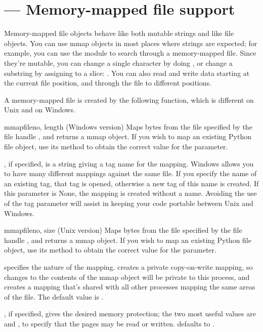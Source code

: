 \section{ ---
	Memory-mapped file support}


Memory-mapped file objects behave like both mutable strings and like
file objects.  You can use mmap objects in most places where strings
are expected; for example, you can use the  module to
search through a memory-mapped file.  Since they're mutable, you can
change a single character by doing , or
change a substring by assigning to a slice:
.  You can also read and write
data starting at the current file position, and 
through the file to different positions.

A memory-mapped file is created by the following function, which is
different on Unix and on Windows.

\begin{funcdesc}{mmap}{fileno, length  }
(Windows version) Maps  bytes from the file specified by
the file handle , and returns a mmap object.  If you wish
to map an existing Python file object, use its 
method to obtain the correct value for the  parameter.

, if specified, is a string giving a tag name for the mapping. 
Windows allows you to have many different mappings against the same
file.  If you specify the name of an existing tag, that tag is opened,
otherwise a new tag of this name is created.  If this parameter is
None, the mapping is created without a name.  Avoiding the use of the
tag parameter will assist in keeping your code portable between Unix
and Windows.
\end{funcdesc}

\begin{funcdesc}{mmap}{fileno, size }
(Unix version) Maps  bytes from the file specified by the
file handle , and returns a mmap object.  If you wish to
map an existing Python file object, use its  method
to obtain the correct value for the  parameter.

 specifies the nature of the mapping.  
 creates a private copy-on-write mapping, so
changes to the contents of the mmap object will be private to this
process, and  creates a mapping that's shared
with all other processes mapping the same areas of the file.
The default value is .

, if specified, gives the desired memory protection; the two 
most useful values are  and , to
specify that the pages may be read or written.
 defaults to .
\end{funcdesc}


